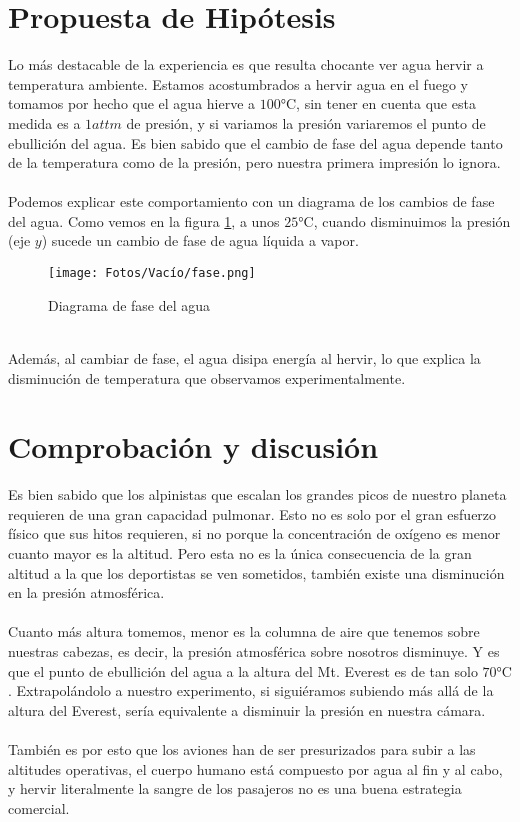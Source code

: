 \section{Propuesta de Hipótesis}
    Lo más destacable de la experiencia es que resulta chocante ver agua hervir a temperatura ambiente. Estamos acostumbrados a hervir agua en el fuego y tomamos por hecho que el agua hierve a $100\si{\celsius}$, sin tener en cuenta que esta medida es a $1\textit{attm}$ de presión, y si variamos la presión variaremos el punto de ebullición del agua. Es bien sabido que el cambio de fase del agua depende tanto de la temperatura como de la presión, pero nuestra primera impresión lo ignora.\\ \\Podemos explicar este comportamiento con un diagrama de los cambios de fase del agua. Como vemos en la figura \ref{fig:fase}, a unos $25\si{\celsius}$, cuando disminuimos la presión (eje $y$) sucede un cambio de fase de agua líquida a vapor.\\
    \begin{figure}[h]\label{fig:fase}
        \centering
        \texttt{[image: Fotos/Vacío/fase.png]}
        \caption{Diagrama de fase del agua}
    \end{figure}
    \hfill{}\\
    Además, al cambiar de fase, el agua disipa energía al hervir, lo que explica la disminución de temperatura que observamos experimentalmente.
\section{Comprobación y discusión}
    Es bien sabido que los alpinistas que escalan los grandes picos de nuestro planeta requieren de una gran capacidad pulmonar. Esto no es solo por el gran esfuerzo físico que sus hitos requieren, si no porque la concentración de oxígeno es menor cuanto mayor es la altitud. Pero esta no es la única consecuencia de la gran altitud a la que los deportistas se ven sometidos, también existe una disminución en la presión atmosférica.\\ \\Cuanto más altura tomemos, menor es la columna de aire que tenemos sobre nuestras cabezas, es decir, la presión atmosférica sobre nosotros disminuye. Y es que el punto de ebullición del agua a la altura del Mt. Everest es de tan solo $70\si{\celsius}$. Extrapolándolo a nuestro experimento, si siguiéramos subiendo más allá de la altura del Everest, sería equivalente a disminuir la presión en nuestra cámara.\\ \\También es por esto que los aviones han de ser presurizados para subir a las altitudes operativas, el cuerpo humano está compuesto por agua al fin y al cabo, y hervir literalmente la sangre de los pasajeros no es una buena estrategia comercial.

